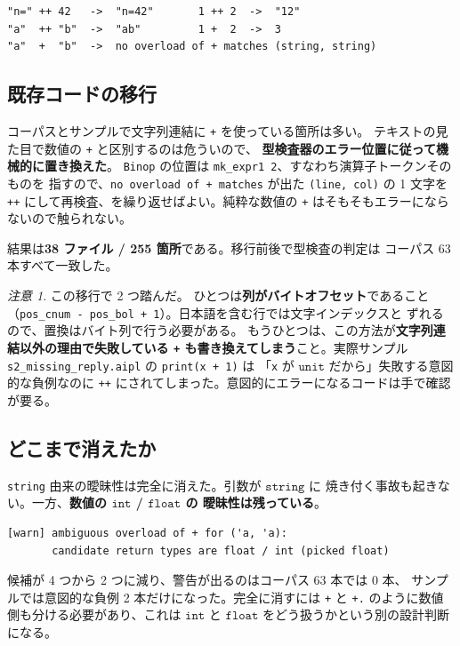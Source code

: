 \documentclass[11pt,a4paper]{ltjsarticle}
\theoremstyle{definition}
\theoremstyle{remark}
\newtheorem{remark}{注意}
\newcommand{\ty}[1]{\ensuremath{\mathtt{#1}}}
\begin{document}
\begin{lstlisting}[language={}]
"n=" ++ 42   ->  "n=42"       1 ++ 2  ->  "12"
"a"  ++ "b"  ->  "ab"         1 +  2  ->  3
"a"  +  "b"  ->  no overload of + matches (string, string)
\end{lstlisting}

\subsection{既存コードの移行}

コーパスとサンプルで文字列連結に \texttt{+} を使っている箇所は多い。
テキストの見た目で数値の \texttt{+} と区別するのは危ういので、
\textbf{型検査器のエラー位置に従って機械的に置き換えた}。
\texttt{Binop} の位置は \texttt{mk\_expr1 2}、すなわち演算子トークンそのものを
指すので、\texttt{no overload of + matches} が出た \texttt{(line, col)} の
1 文字を \texttt{++} にして再検査、を繰り返せばよい。純粋な数値の
\texttt{+} はそもそもエラーにならないので触られない。

結果は\textbf{38 ファイル / 255 箇所}である。移行前後で型検査の判定は
コーパス 63 本すべて一致した。

\begin{remark}
この移行で 2 つ踏んだ。
ひとつは\textbf{列がバイトオフセット}であること
（\texttt{pos\_cnum - pos\_bol + 1}）。日本語を含む行では文字インデックスと
ずれるので、置換はバイト列で行う必要がある。
もうひとつは、この方法が\textbf{文字列連結以外の理由で失敗している
\texttt{+} も書き換えてしまう}こと。実際サンプル
\texttt{s2\_missing\_reply.aipl} の \texttt{print(x + 1)} は
「\texttt{x} が \ty{unit} だから」失敗する意図的な負例なのに
\texttt{++} にされてしまった。意図的にエラーになるコードは手で確認が要る。
\end{remark}

\subsection{どこまで消えたか}

\texttt{string} 由来の曖昧性は完全に消えた。引数が \ty{string} に
焼き付く事故も起きない。一方、\textbf{数値の \ty{int} / \ty{float} の
曖昧性は残っている}。

\begin{lstlisting}[language={}]
[warn] ambiguous overload of + for ('a, 'a):
       candidate return types are float / int (picked float)
\end{lstlisting}

候補が 4 つから 2 つに減り、警告が出るのはコーパス 63 本では 0 本、
サンプルでは意図的な負例 2 本だけになった。完全に消すには
\texttt{+} と \texttt{+.} のように数値側も分ける必要があり、これは
\ty{int} と \ty{float} をどう扱うかという別の設計判断になる。
\end{document}

